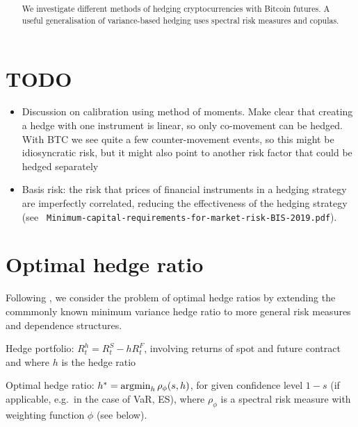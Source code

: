 \documentclass[square]{article} %
\theoremstyle{plain}
\theoremstyle{definition} %
\begin{document}
\setlength{\boxlength}{0.95\textwidth} %
\title{\large{\bf{}}} %
\author{{\normalsize\bf{}}}%
\thispagestyle{empty}
\addtocounter{page}{1}
\maketitle
\begin{abstract}
  We investigate different methods of hedging cryptocurrencies with
  Bitcoin futures. A useful generalisation of variance-based hedging
  uses spectral risk measures and copulas. 
\end{abstract}
\vspace{.5cm}
\def\contentsname{Contents}
\tableofcontents
\vspace{.5cm}

\section{TODO}
\label{sec:todo}

\begin{itemize}
\item Discussion on calibration using method of moments. Make clear
  that creating a hedge with one instrument is linear, so only
  co-movement can be hedged. With BTC we see quite a few
  counter-movement events, so this might be idiosyncratic risk, but it
  might also point to another risk factor that could be hedged
  separately
\item Basis risk: the risk that prices of financial instruments in a
  hedging strategy are imperfectly correlated, reducing the
  effectiveness of the hedging strategy (see {\tt
    Minimum-capital-requirements-for-market-risk-BIS-2019.pdf}). 
\end{itemize}

\section{Optimal hedge ratio}
\label{sec:optimal-hedge-ratio}

Following \citep{Barbi2014}, we consider the problem of optimal
hedge ratios by extending the commmonly known minimum variance hedge
ratio to more general risk measures and dependence
structures.\medskip

Hedge portfolio: $R_t^h = R_t^S - h R_t^F$, involving returns of spot
and future contract and where $h$ is the hedge ratio

Optimal hedge ratio: $h^\ast = \argmin_h \rho_\phi(s,h)$, for given
confidence level $1-s$ (if applicable, e.g.\ in the case of VaR, ES),
where $\rho_\phi$ is a spectral risk measure with weighting function
$\phi$ (see below).
\end{document}
